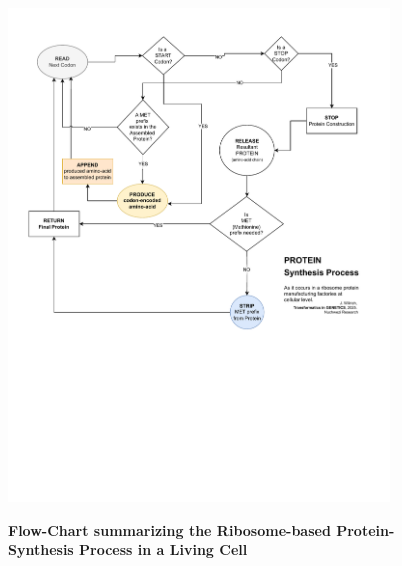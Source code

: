\documentclass[a4paper, 18pt]{book} %
\begin{document}
\begin{figure}[H]
  \begin{center}
   \includegraphics[trim=0cm 8cm 0cm 0cm, clip, width=0.9\textwidth,]{resources/pdfs/ProteinSynthesisProcessFlowChart.pdf}\\
   \caption{\textbf{Flow-Chart summarizing the Ribosome-based Protein-Synthesis Process in a Living Cell}}
  \label{FIG3}
  \end{center}
\end{figure}
\end{document}
